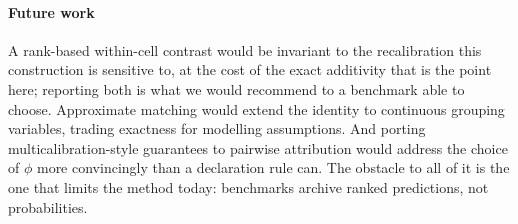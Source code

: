 \paragraph{Future work} A rank-based within-cell contrast would be invariant to the
recalibration this construction is sensitive to, at the cost of the exact additivity that is
the point here; reporting both is what we would recommend to a benchmark able to choose.
Approximate matching would extend the identity to continuous grouping variables, trading
exactness for modelling assumptions. And porting multicalibration-style guarantees to
pairwise attribution would address the choice of $\phi$ more convincingly than a declaration
rule can. The obstacle to all of it is the one that limits the method today: benchmarks
archive ranked predictions, not probabilities.
